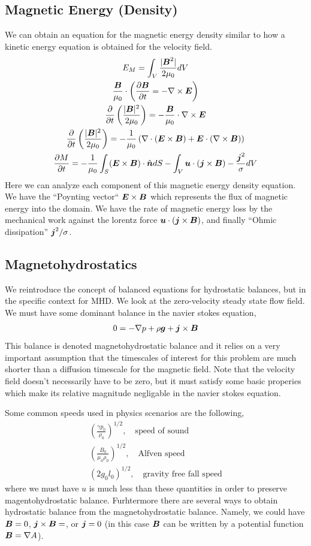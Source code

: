 \documentclass{article}
\begin{document}
\subsection{Magnetic Energy (Density)}
We can obtain an equation for the magnetic energy density similar to how a
kinetic energy equation is obtained for the velocity field.
\begin{gather*}
    E_M = \int_V\frac{|\boldsymbol{B}^2|}{2\mu_0}dV \\
    \frac{\boldsymbol{B}}{\mu_0} \cdot \left( \frac{\partial \boldsymbol{B}}{\partial t} = -\nabla\times\boldsymbol{E}\right)\\
    \frac{\partial }{\partial t}\left(\frac{|\boldsymbol{B}|^2}{2\mu_0}\right) =
    -\frac{\boldsymbol{B}}{\mu_0}\cdot\nabla\times\boldsymbol{E}\\
    \frac{\partial }{\partial t}\left(\frac{|\boldsymbol{B}|^2}{2\mu_0}\right) =
    -\frac{1}{\mu_0}\left(\nabla\cdot(\boldsymbol{E}\times\boldsymbol{B}) +
    \boldsymbol{E}\cdot(\nabla\times\boldsymbol{B})\right)\\
    \frac{\partial M}{\partial t} =
    -\frac{1}{\mu_0}\int_S(\boldsymbol{E}\times\boldsymbol{B})\cdot\hat{\boldsymbol{n}} dS - \int_V
    \boldsymbol{u}\cdot(\boldsymbol{j}\times\boldsymbol{B}) - \frac{\boldsymbol{j}^2}{\sigma} dV
\end{gather*}
Here we can analyze each component of this magnetic energy density equation. We
have the ``Poynting vector`` $\boldsymbol{E}\times\boldsymbol{B}$ which represents the flux of magnetic
energy into the domain. We have the rate of magnetic energy loss by the
mechanical work against the lorentz force $\boldsymbol{u}\cdot(\boldsymbol{j}\times\boldsymbol{B})$, and
finally ``Ohmic dissipation'' $\boldsymbol{j}^2/\sigma$. 


\subsection{Magnetohydrostatics}
We reintroduce the concept of balanced equations for hydrostatic balances, but
in the specific context for MHD. We look at the zero-velocity steady state flow
field. We must have some dominant balance in the navier stokes equation, 
\begin{gather*}
    0 = -\nabla p + \rho \boldsymbol{g} + \boldsymbol{j}\times\boldsymbol{B}
\end{gather*}
This balance is denoted magnetohydrostatic balance and it relies on a very
important assumption that the timescales of interest for this problem are much
shorter than a diffusion timescale for the magnetic field. Note that the
velocity field doesn't necessarily have to be zero, but it must satisfy some
basic properies which make its relative magnitude negligable in the navier
stokes equation. 

Some common speeds used in physics scenarios are the following,
\begin{gather*}
    \left(\frac{\gamma p_0}{\rho_0}\right)^{1/2}, \quad \text{speed of sound}\\
    \left(\frac{B_0}{\mu_0\rho_0}\right)^{1/2}, \quad \text{Alfven speed}\\
    \left(2g_0l_0\right)^{1/2}, \quad \text{gravity free fall speed}
\end{gather*}
where we must have $u$ is much less than these quantities in order to preserve
magentohydrostatic balance. Furhtermore there are several ways to obtain
hydrostatic balance from the magnetohydrostatic balance. Namely, we could have
$\boldsymbol{B} = 0$, $\boldsymbol{j}\times\boldsymbol{B} = $, or $\boldsymbol{j} = 0$ (in this case $\boldsymbol{B}$ can be written by
a potential function $\boldsymbol{B} = \nabla A$). 
\end{document}
